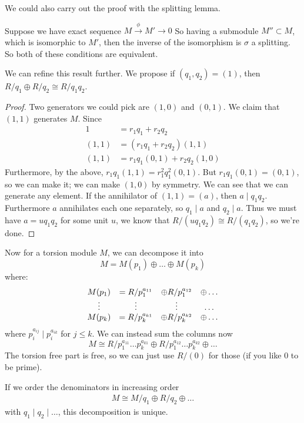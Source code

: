 We could also carry out the proof with the splitting lemma.
\begin{theorem}
    Suppose we have exact sequence $M \xrightarrow{\phi} M' \to 0$
    So having a submodule $M'' \subset M$, which is isomorphic to $M'$, then
    the inverse of the isomorphism is $\sigma$ a splitting. So both of these conditions are equivalent.
\end{theorem}
We can refine this result further. We propose if $(q_1, q_2) = (1)$, then $R/q_1 \oplus R/q_2 \cong R/q_1 q_2$.
\begin{proof}
    Two generators we could pick are $(1, 0)$ and $(0, 1)$. We claim that $(1, 1)$ generates $M$.
    Since 
    \begin{align*}
        1 &= r_1 q_1 + r_2 q_2 \\
        (1, 1) &= (r_1 q_1 + r_2 q_2)(1, 1) \\
        (1, 1) &= r_1 q_1 (0, 1) + r_2 q_2 (1, 0)
    \end{align*}
    Furthermore, by the above, $r_1 q_1(1, 1) = r_1^2 q_1^2 (0, 1)$.
    But $r_1 q_1 (0, 1) = (0, 1)$, so we can make it; we can make $(1, 0)$ by symmetry.
    We can see that we can generate any element.
    If the annihilator of $(1, 1) = (a)$,
    then $a \mid q_1 q_2$. Furthermore $a$ annihilates each one separately, so $q_1 \mid a$ and $q_2 \mid a$.
    Thus we must have $a = u q_1 q_2$ for some unit $u$, we know that $R/(uq_1q_2) \cong R/(q_1 q_2)$, so we're done.
\end{proof}
Now for a torsion module $M$, we can decompose it into
\[ M = M(p_1) \oplus \dots \oplus M(p_k) \]
where:
\[\begin{array}{c c c c}
    M(p_1) &= R/p_1^{a_{11}} &\oplus R/p_1^{a_{12}} &\oplus \dots \\
    \vdots & \vdots & \vdots & \dots \\
    M(p_k) &= R/p_k^{a_{k1}} &\oplus R/p_k^{a_{k2}} &\oplus \dots \\
\end{array}\]
where $p_i^{a_{ij}} \mid p_i^{a_{ik}}$ for $j \le k$.
We can instead sum the columns now
\[ M \cong R/p_1^{a_{11}}\dots p_{k}^{a_{k1}} \oplus R/p_1^{a_{12}}\dots p_{k}^{a_{k2}} \oplus \dots \]
The torsion free part is free, so we can just use $R/(0)$ for those (if you like $0$ to be prime). 
\begin{theorem}
    If we order the denominators in increasing order 
    \begin{align*}
        M \cong M/q_1 \oplus R/q_2 \oplus \dots
    \end{align*}
    with $q_1 \mid q_2 \mid \dots$, this decomposition is unique.
\end{theorem}
